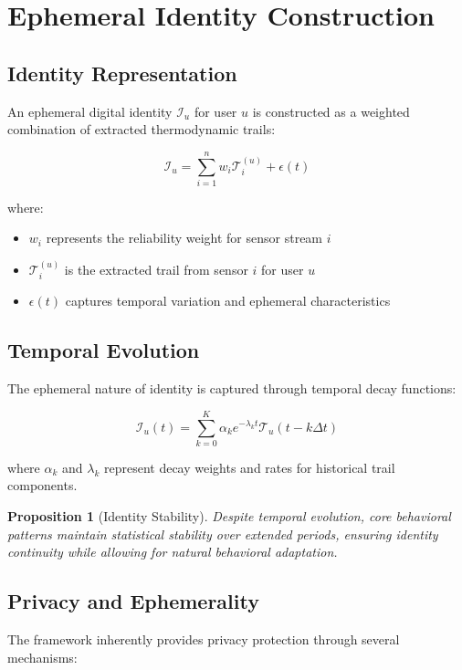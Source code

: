 \documentclass[12pt,a4paper]{article}
\newtheorem{proposition}{Proposition}
\begin{document}
\section{Ephemeral Identity Construction}

\subsection{Identity Representation}

An ephemeral digital identity $\mathcal{I}_u$ for user $u$ is constructed as a weighted combination of extracted thermodynamic trails:

$$\mathcal{I}_u = \sum_{i=1}^n w_i \mathcal{T}_i^{(u)} + \epsilon(t)$$

where:
\begin{itemize}
\item $w_i$ represents the reliability weight for sensor stream $i$
\item $\mathcal{T}_i^{(u)}$ is the extracted trail from sensor $i$ for user $u$
\item $\epsilon(t)$ captures temporal variation and ephemeral characteristics
\end{itemize}

\subsection{Temporal Evolution}

The ephemeral nature of identity is captured through temporal decay functions:

$$\mathcal{I}_u(t) = \sum_{k=0}^{K} \alpha_k e^{-\lambda_k t} \mathcal{T}_u(t-k\Delta t)$$

where $\alpha_k$ and $\lambda_k$ represent decay weights and rates for historical trail components.

\begin{proposition}[Identity Stability]
Despite temporal evolution, core behavioral patterns maintain statistical stability over extended periods, ensuring identity continuity while allowing for natural behavioral adaptation.
\end{proposition}

\subsection{Privacy and Ephemerality}

The framework inherently provides privacy protection through several mechanisms:
\end{document}
